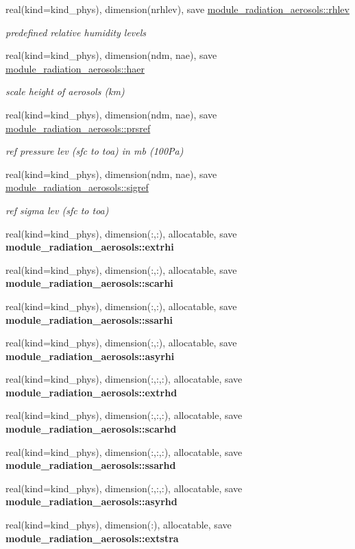 \begin{DoxyCompactItemize}
real(kind=kind\+\_\+phys), dimension(nrhlev), save \hyperlink{group__module__radiation__aerosols_ga6aa3218393ea05cab77ab7867cfeab90}{module\+\_\+radiation\+\_\+aerosols\+::rhlev}
\begin{DoxyCompactList}\small\item\em predefined relative humidity levels \end{DoxyCompactList}\item 
real(kind=kind\+\_\+phys), dimension(ndm, nae), save \hyperlink{group__module__radiation__aerosols_ga8ce24a58afb33dd372995bf5aaf95be9}{module\+\_\+radiation\+\_\+aerosols\+::haer}
\begin{DoxyCompactList}\small\item\em scale height of aerosols (km) \end{DoxyCompactList}\item 
real(kind=kind\+\_\+phys), dimension(ndm, nae), save \hyperlink{group__module__radiation__aerosols_ga274fad1b6e00e66375882e32494d61c0}{module\+\_\+radiation\+\_\+aerosols\+::prsref}
\begin{DoxyCompactList}\small\item\em ref pressure lev (sfc to toa) in mb (100\+Pa) \end{DoxyCompactList}\item 
real(kind=kind\+\_\+phys), dimension(ndm, nae), save \hyperlink{group__module__radiation__aerosols_ga227ac7558dc0f33c34c34544771617ec}{module\+\_\+radiation\+\_\+aerosols\+::sigref}
\begin{DoxyCompactList}\small\item\em ref sigma lev (sfc to toa) \end{DoxyCompactList}\item 
real(kind=kind\+\_\+phys), dimension(\+:,\+:), allocatable, save {\bfseries module\+\_\+radiation\+\_\+aerosols\+::extrhi}
\item 
real(kind=kind\+\_\+phys), dimension(\+:,\+:), allocatable, save {\bfseries module\+\_\+radiation\+\_\+aerosols\+::scarhi}
\item 
real(kind=kind\+\_\+phys), dimension(\+:,\+:), allocatable, save {\bfseries module\+\_\+radiation\+\_\+aerosols\+::ssarhi}
\item 
real(kind=kind\+\_\+phys), dimension(\+:,\+:), allocatable, save {\bfseries module\+\_\+radiation\+\_\+aerosols\+::asyrhi}
\item 
real(kind=kind\+\_\+phys), dimension(\+:,\+:,\+:), allocatable, save {\bfseries module\+\_\+radiation\+\_\+aerosols\+::extrhd}
\item 
real(kind=kind\+\_\+phys), dimension(\+:,\+:,\+:), allocatable, save {\bfseries module\+\_\+radiation\+\_\+aerosols\+::scarhd}
\item 
real(kind=kind\+\_\+phys), dimension(\+:,\+:,\+:), allocatable, save {\bfseries module\+\_\+radiation\+\_\+aerosols\+::ssarhd}
\item 
real(kind=kind\+\_\+phys), dimension(\+:,\+:,\+:), allocatable, save {\bfseries module\+\_\+radiation\+\_\+aerosols\+::asyrhd}
\item 
real(kind=kind\+\_\+phys), dimension(\+:), allocatable, save {\bfseries module\+\_\+radiation\+\_\+aerosols\+::extstra}
\end{DoxyCompactItemize}
